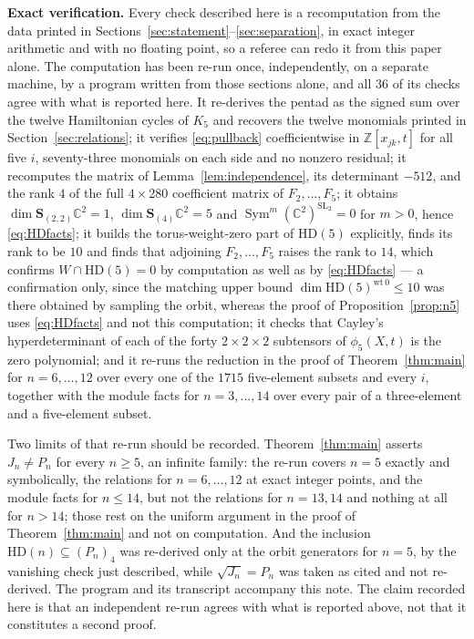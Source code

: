 \documentclass[11pt]{amsart}
\theoremstyle{remark}
\newcommand{\C}{\mathbb C}
\newcommand{\HD}{\mathrm{HD}}
\newcommand{\Sym}{\operatorname{Sym}}
\newcommand{\bS}{\mathbf S}
\begin{document}
\medskip
\noindent\textbf{Exact verification.}
Every check described here is a recomputation from the data printed in
Sections~\ref{sec:statement}--\ref{sec:separation}, in exact integer
arithmetic and with no floating point, so a referee can redo it from this
paper alone. The computation has been re-run once, independently, on a
separate machine, by a program written from those sections alone, and all
\(36\) of its checks agree with what is reported here. It re-derives the
pentad as the signed sum over the twelve Hamiltonian cycles of \(K_5\) and
recovers the twelve monomials printed in Section~\ref{sec:relations}; it
verifies \eqref{eq:pullback} coefficientwise in
\(\mathbb Z[x_{jk},t]\) for all five \(i\), seventy-three monomials on each
side and no nonzero residual; it recomputes the matrix of
Lemma~\ref{lem:independence}, its determinant \(-512\), and the rank \(4\)
of the full \(4\times280\) coefficient matrix of \(F_2,\dots,F_5\); it
obtains \(\dim\bS_{(2,2)}\C^2=1\), \(\dim\bS_{(4)}\C^2=5\) and
\(\Sym^m(\C^2)^{\mathrm{SL}_2}=0\) for \(m>0\), hence
\eqref{eq:HDfacts}; it builds the torus-weight-zero part of \(\HD(5)\)
explicitly, finds its rank to be \(10\) and finds that adjoining
\(F_2,\dots,F_5\) raises the rank to \(14\), which confirms
\(W\cap\HD(5)=0\) by computation as well as by \eqref{eq:HDfacts} --- a
confirmation only, since the matching upper bound
\(\dim\HD(5)^{\mathrm{wt}\,0}\leq10\) was there obtained by sampling the
orbit, whereas the proof of Proposition~\ref{prop:n5} uses
\eqref{eq:HDfacts} and not this computation; it checks that Cayley's
hyperdeterminant of each of the forty \(2\times2\times2\) subtensors of
\(\phi_5(X,t)\) is the zero polynomial; and it re-runs the reduction in the
proof of Theorem~\ref{thm:main} for \(n=6,\dots,12\) over every one of the
\(1715\) five-element subsets and every \(i\), together with the module
facts for \(n=3,\dots,14\) over every pair of a three-element and a
five-element subset.

Two limits of that re-run should be recorded. Theorem~\ref{thm:main}
asserts \(J_n\neq P_n\) for every \(n\geq5\), an infinite family: the
re-run covers \(n=5\) exactly and symbolically, the relations for
\(n=6,\dots,12\) at exact integer points, and the module facts for
\(n\leq14\), but not the relations for \(n=13,14\) and nothing at all for
\(n>14\); those rest on the uniform argument in the proof of
Theorem~\ref{thm:main} and not on computation. And the inclusion
\(\HD(n)\subseteq(P_n)_4\) was re-derived only at the orbit generators for
\(n=5\), by the vanishing check just described, while \(\sqrt{J_n}=P_n\)
was taken as cited and not re-derived. The program and its transcript
accompany this note. The claim
recorded here is that an independent re-run agrees with what is reported
above, not that it constitutes a second proof.
\end{document}
